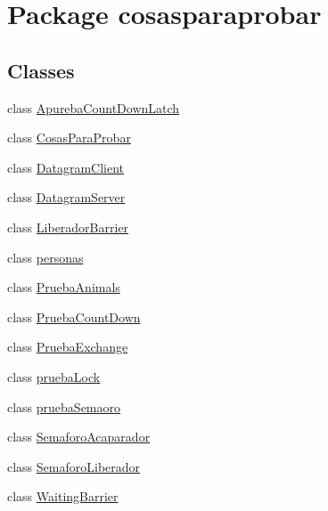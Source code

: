 \hypertarget{namespacecosasparaprobar}{}\section{Package cosasparaprobar}
\label{namespacecosasparaprobar}
\subsection*{Classes}
\begin{DoxyCompactItemize}
\item 
class \mbox{\hyperlink{classcosasparaprobar_1_1_apureba_count_down_latch}{Apureba\+Count\+Down\+Latch}}
\item 
class \mbox{\hyperlink{classcosasparaprobar_1_1_cosas_para_probar}{Cosas\+Para\+Probar}}
\item 
class \mbox{\hyperlink{classcosasparaprobar_1_1_datagram_client}{Datagram\+Client}}
\item 
class \mbox{\hyperlink{classcosasparaprobar_1_1_datagram_server}{Datagram\+Server}}
\item 
class \mbox{\hyperlink{classcosasparaprobar_1_1_liberador_barrier}{Liberador\+Barrier}}
\item 
class \mbox{\hyperlink{classcosasparaprobar_1_1personas}{personas}}
\item 
class \mbox{\hyperlink{classcosasparaprobar_1_1_prueba_animals}{Prueba\+Animals}}
\item 
class \mbox{\hyperlink{classcosasparaprobar_1_1_prueba_count_down}{Prueba\+Count\+Down}}
\item 
class \mbox{\hyperlink{classcosasparaprobar_1_1_prueba_exchange}{Prueba\+Exchange}}
\item 
class \mbox{\hyperlink{classcosasparaprobar_1_1prueba_lock}{prueba\+Lock}}
\item 
class \mbox{\hyperlink{classcosasparaprobar_1_1prueba_semaoro}{prueba\+Semaoro}}
\item 
class \mbox{\hyperlink{classcosasparaprobar_1_1_semaforo_acaparador}{Semaforo\+Acaparador}}
\item 
class \mbox{\hyperlink{classcosasparaprobar_1_1_semaforo_liberador}{Semaforo\+Liberador}}
\item 
class \mbox{\hyperlink{classcosasparaprobar_1_1_waiting_barrier}{Waiting\+Barrier}}
\end{DoxyCompactItemize}
